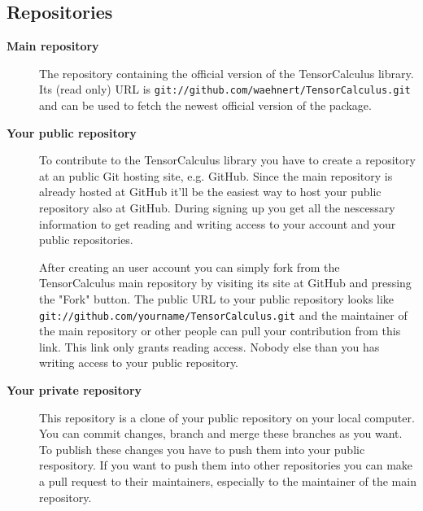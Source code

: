\documentclass[a4paper,10pt]{scrartcl}
\begin{document}
\subsection*{Repositories}
\begin{description} 
 \item[\textbf{Main repository}] The repository containing the official version of the TensorCalculus library. Its (read only) URL is \texttt{git://github.com/waehnert/TensorCalculus.git} and can be used to fetch the newest official version of the package.
  \item[\textbf{Your public repository}] To contribute to the TensorCalculus library you have to create a repository at an public Git hosting site, e.g. GitHub. Since the main repository is already hosted at GitHub it'll be the easiest way to host your public repository also at GitHub. During signing up you get all the nescessary information to get reading and writing access to your account and your public repositories.

After creating an user account you can simply fork from the TensorCalculus main repository by visiting its site at GitHub and pressing the "Fork" button. The public URL to your public repository looks like \texttt{git://github.com/yourname/TensorCalculus.git} and the maintainer of the main repository or other people can pull your contribution from this link. This link only grants reading access. Nobody else than you has writing access to your public repository.
  \item[\textbf{Your private repository}] This repository is a clone of your public repository on your local computer. You can commit changes, branch and merge these branches as you want. To publish these changes you have to push them into your public respository. If you want to push them into other repositories you can make a pull request to their maintainers, especially to the maintainer of the main repository.
\end{description}
\end{document}
